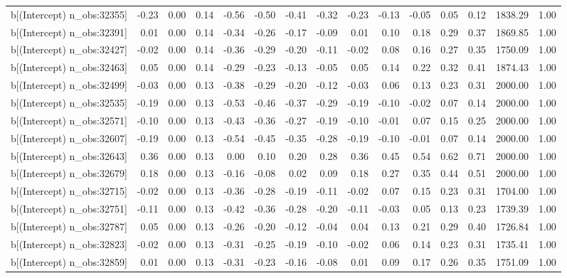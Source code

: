\begin{table}[ht]
\begin{tabular}{rrrrrrrrrrrrrrr}
  b[(Intercept) n\_obs:32355] & -0.23 & 0.00 & 0.14 & -0.56 & -0.50 & -0.41 & -0.32 & -0.23 & -0.13 & -0.05 & 0.05 & 0.12 & 1838.29 & 1.00 \\ 
  b[(Intercept) n\_obs:32391] & 0.01 & 0.00 & 0.14 & -0.34 & -0.26 & -0.17 & -0.09 & 0.01 & 0.10 & 0.18 & 0.29 & 0.37 & 1869.85 & 1.00 \\ 
  b[(Intercept) n\_obs:32427] & -0.02 & 0.00 & 0.14 & -0.36 & -0.29 & -0.20 & -0.11 & -0.02 & 0.08 & 0.16 & 0.27 & 0.35 & 1750.09 & 1.00 \\ 
  b[(Intercept) n\_obs:32463] & 0.05 & 0.00 & 0.14 & -0.29 & -0.23 & -0.13 & -0.05 & 0.05 & 0.14 & 0.22 & 0.32 & 0.41 & 1874.43 & 1.00 \\ 
  b[(Intercept) n\_obs:32499] & -0.03 & 0.00 & 0.13 & -0.38 & -0.29 & -0.20 & -0.12 & -0.03 & 0.06 & 0.13 & 0.23 & 0.31 & 2000.00 & 1.00 \\ 
  b[(Intercept) n\_obs:32535] & -0.19 & 0.00 & 0.13 & -0.53 & -0.46 & -0.37 & -0.29 & -0.19 & -0.10 & -0.02 & 0.07 & 0.14 & 2000.00 & 1.00 \\ 
  b[(Intercept) n\_obs:32571] & -0.10 & 0.00 & 0.13 & -0.43 & -0.36 & -0.27 & -0.19 & -0.10 & -0.01 & 0.07 & 0.15 & 0.25 & 2000.00 & 1.00 \\ 
  b[(Intercept) n\_obs:32607] & -0.19 & 0.00 & 0.13 & -0.54 & -0.45 & -0.35 & -0.28 & -0.19 & -0.10 & -0.01 & 0.07 & 0.14 & 2000.00 & 1.00 \\ 
  b[(Intercept) n\_obs:32643] & 0.36 & 0.00 & 0.13 & 0.00 & 0.10 & 0.20 & 0.28 & 0.36 & 0.45 & 0.54 & 0.62 & 0.71 & 2000.00 & 1.00 \\ 
  b[(Intercept) n\_obs:32679] & 0.18 & 0.00 & 0.13 & -0.16 & -0.08 & 0.02 & 0.09 & 0.18 & 0.27 & 0.35 & 0.44 & 0.51 & 2000.00 & 1.00 \\ 
  b[(Intercept) n\_obs:32715] & -0.02 & 0.00 & 0.13 & -0.36 & -0.28 & -0.19 & -0.11 & -0.02 & 0.07 & 0.15 & 0.23 & 0.31 & 1704.00 & 1.00 \\ 
  b[(Intercept) n\_obs:32751] & -0.11 & 0.00 & 0.13 & -0.42 & -0.36 & -0.28 & -0.20 & -0.11 & -0.03 & 0.05 & 0.13 & 0.23 & 1739.39 & 1.00 \\ 
  b[(Intercept) n\_obs:32787] & 0.05 & 0.00 & 0.13 & -0.26 & -0.20 & -0.12 & -0.04 & 0.04 & 0.13 & 0.21 & 0.29 & 0.40 & 1726.84 & 1.00 \\ 
  b[(Intercept) n\_obs:32823] & -0.02 & 0.00 & 0.13 & -0.31 & -0.25 & -0.19 & -0.10 & -0.02 & 0.06 & 0.14 & 0.23 & 0.31 & 1735.41 & 1.00 \\ 
  b[(Intercept) n\_obs:32859] & 0.01 & 0.00 & 0.13 & -0.31 & -0.23 & -0.16 & -0.08 & 0.01 & 0.09 & 0.17 & 0.26 & 0.35 & 1751.09 & 1.00 \\ 

\end{tabular}
\end{table}
